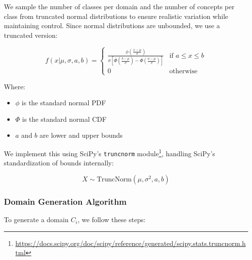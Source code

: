 We sample the number of classes per domain and the number of concepts per class from truncated normal distributions to ensure realistic variation while maintaining control. Since normal distributions are unbounded, we use a truncated version:

\begin{equation*}
    f(x|\mu, \sigma, a, b) =
    \begin{cases}
        \frac{\phi\left(\frac{x-\mu}{\sigma}\right)}{\sigma\left[\Phi\left(\frac{b-\mu}{\sigma}\right) - \Phi\left(\frac{a-\mu}{\sigma}\right)\right]} & \text{if } a \leq x \leq b \\
        0                                                                                                                                              & \text{otherwise}
    \end{cases}
\end{equation*}

Where:
\begin{itemize}
    \item $\phi$ is the standard normal PDF
    \item $\Phi$ is the standard normal CDF
    \item $a$ and $b$ are lower and upper bounds
\end{itemize}

We implement this using SciPy's \texttt{truncnorm} module\footnote{\url{https://docs.scipy.org/doc/scipy/reference/generated/scipy.stats.truncnorm.html}},
handling SciPy's standardization of bounds internally:

\begin{equation*}
    X \sim \text{TruncNorm}(\mu, \sigma^2, a, b)
\end{equation*}

\subsubsection{Domain Generation Algorithm}

To generate a domain $C_i$, we follow these steps:

